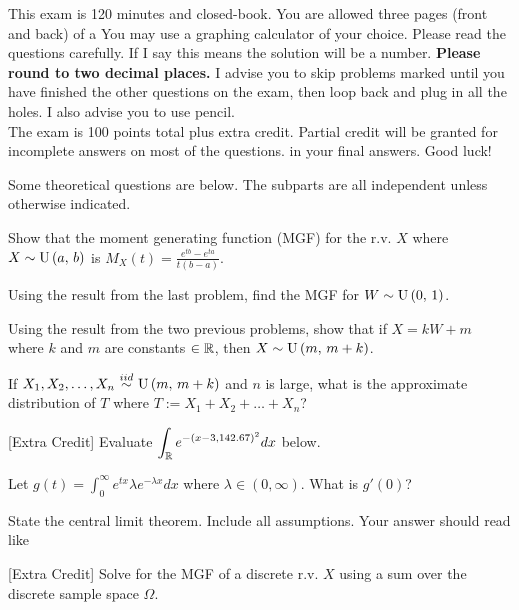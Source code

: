 \documentclass[12pt]{article}
\begin{document}
This exam is 120 minutes and closed-book. You are allowed three pages (front and back) of a  You may use a graphing calculator of your choice. Please read the questions carefully. If I say  this means the solution will be a number. \textbf{Please round to two decimal places.} I advise you to skip problems marked  until you have finished the other questions on the exam, then loop back and plug in all the holes. I also advise you to use pencil.\\

\noindent The exam is 100 points total plus extra credit. Partial credit will be granted for incomplete answers on most of the questions.  in your final answers. Good luck!

\pagebreak

\problem Some theoretical questions are below. The subparts are all independent unless
otherwise indicated.

\benum
{} Show that the moment generating function (MGF) for the r.v. $X$ where $X \sim \mathrm{U}\left(a,\,b\right)$ is $M_X(t) = \frac{e^{tb} - e^{ta}}{t(b-a)}$. 

 Using the result from the last problem, find the MGF for $W \sim \mathrm{U}\left(0,\,1\right)$. 

 Using the result from the two previous problems, show that if $X = kW + m$ where $k$ and $m$ are constants $\in \mathbb{R}$, then $X \sim \mathrm{U}\left(m,\,m + k\right)$. 

 If $X_1, X_2, \ldots, X_n \iid \uniform{m}{m + k}$ and $n$ is large, what is the approximate distribution of $T$ where $T := X_1 + X_2 + \ldots + X_n$? 

 [Extra Credit] Evaluate $\displaystyle \int_{\mathbb{R}} e^{-\left(x - 3,142.67\right)^2} dx$ below. 


 Let $\displaystyle g(t) = \int_0^\infty e^{tx} \lambda e^{-\lambda x} dx$ where $\lambda \in (0, \infty)$. What is $g'(0)$? 

 State the central limit theorem. Include all assumptions. Your answer should read like  

 [Extra Credit] Solve for the MGF of a discrete r.v. $X$ using a sum over the discrete sample space $\Omega$. 

\eenum
\end{document}
